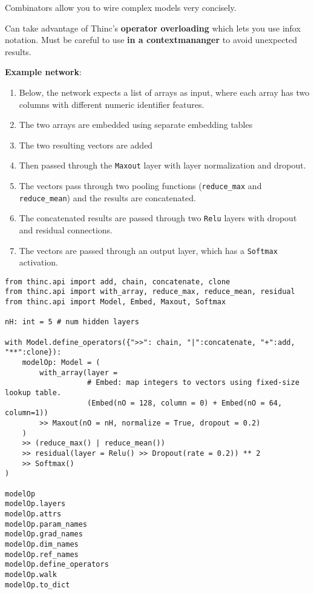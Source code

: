 \documentclass[
]{article}
\providecommand{\tightlist}{%
  \setlength{\itemsep}{0pt}\setlength{\parskip}{0pt}}
\begin{document}
Combinators allow you to wire complex models very concisely.

Can take advantage of Thinc's \textbf{operator overloading} which lets
you use infox notation. Must be careful to use \textbf{in a
contextmananger} to avoid unexpected results.

\textbf{Example network}:

\begin{enumerate}
\def\labelenumi{\arabic{enumi}.}
\tightlist
\item
  Below, the network expects a list of arrays as input, where each array
  has two columns with different numeric identifier features.
\item
  The two arrays are embedded using separate embedding tables
\item
  The two resulting vectors are added
\item
  Then passed through the \texttt{Maxout} layer with layer
  normalization and dropout.
\item
  The vectors pass through two pooling functions
  (\texttt{reduce_max} and
  \texttt{reduce_mean}) and the results are concatenated.
\item
  The concatenated results are passed through two
  \texttt{Relu} layers with dropout and residual
  connections.
\item
  The vectors are passed through an output layer, which has a
  \texttt{Softmax} activation.
\end{enumerate}

\begin{verbatim}
from thinc.api import add, chain, concatenate, clone
from thinc.api import with_array, reduce_max, reduce_mean, residual
from thinc.api import Model, Embed, Maxout, Softmax

nH: int = 5 # num hidden layers

with Model.define_operators({">>": chain, "|":concatenate, "+":add, "**":clone}):
    modelOp: Model = (
        with_array(layer =
                   # Embed: map integers to vectors using fixed-size lookup table.
                   (Embed(nO = 128, column = 0) + Embed(nO = 64, column=1))
        >> Maxout(nO = nH, normalize = True, dropout = 0.2)
    )
    >> (reduce_max() | reduce_mean())
    >> residual(layer = Relu() >> Dropout(rate = 0.2)) ** 2
    >> Softmax()
)

modelOp
modelOp.layers
modelOp.attrs
modelOp.param_names
modelOp.grad_names
modelOp.dim_names
modelOp.ref_names
modelOp.define_operators
modelOp.walk
modelOp.to_dict
\end{verbatim}
\end{document}
